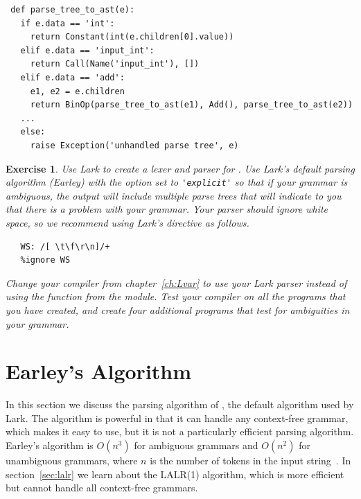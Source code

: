 \documentclass[7x10]{TimesAPriori_MIT}%
\newtheorem{exercise}[theorem]{Exercise}
\numberwithin{theorem}{chapter}
\numberwithin{definition}{chapter}
\numberwithin{equation}{chapter}
\begin{document}
{\begin{center}
\begin{minipage}{0.95\textwidth}
\begin{lstlisting}
 def parse_tree_to_ast(e):
   if e.data == 'int':
     return Constant(int(e.children[0].value))
   elif e.data == 'input_int':
     return Call(Name('input_int'), [])
   elif e.data == 'add':
     e1, e2 = e.children
     return BinOp(parse_tree_to_ast(e1), Add(), parse_tree_to_ast(e2))
   ...
   else:
     raise Exception('unhandled parse tree', e)
\end{lstlisting}
\end{minipage}
\end{center}

\begin{exercise}
  \normalfont\normalsize
%
  Use Lark to create a lexer and parser for \LangVar{}.  Use Lark's
  default parsing algorithm (Earley) with the  option
  set to \lstinline{'explicit'} so that if your grammar is ambiguous, the
  output will include multiple parse trees that will indicate to you
  that there is a problem with your grammar. Your parser should ignore
  white space, so we recommend using Lark's  directive
  as follows.
\begin{lstlisting}
   WS: /[ \t\f\r\n]/+
   %ignore WS
\end{lstlisting}
Change your compiler from chapter~\ref{ch:Lvar} to use your
Lark parser instead of using the  function from
the  module. Test your compiler on all the \LangVar{}
programs that you have created, and create four additional programs
that test for ambiguities in your grammar.
\end{exercise}


\section{Earley's Algorithm}
\label{sec:earley}

In this section we discuss the parsing algorithm of
\citet{Earley:1970ly}, the default algorithm used by Lark.  The
algorithm is powerful in that it can handle any context-free grammar,
which makes it easy to use, but it is not a particularly
efficient parsing algorithm. Earley's algorithm is $O(n^3)$ for
ambiguous grammars and $O(n^2)$ for unambiguous grammars, where $n$ is
the number of tokens in the input
string~\citep{Hopcroft06:_automata}. In section~\ref{sec:lalr} we
learn about the LALR(1) algorithm, which is more efficient but cannot
handle all context-free grammars.

}
\end{document}
